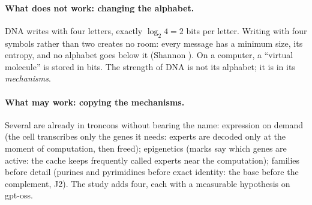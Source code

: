 \paragraph{What does not work: changing the alphabet.} DNA writes with four letters, exactly $\log_2 4 = 2$ bits per letter. Writing with four symbols rather than two creates no room: every message has a minimum size, its entropy, and no alphabet goes below it (Shannon \cite{shannon1948}). On a computer, a ``virtual molecule'' is stored in bits. The strength of DNA is not its alphabet; it is in its \emph{mechanisms}.

\paragraph{What may work: copying the mechanisms.} Several are already in troncons without bearing the name: expression on demand (the cell transcribes only the genes it needs: experts are decoded only at the moment of computation, then freed); epigenetics (marks say which genes are active: the cache keeps frequently called experts near the computation); families before detail (purines and pyrimidines before exact identity: the base before the complement, J2). The study adds four, each with a measurable hypothesis on gpt-oss.

